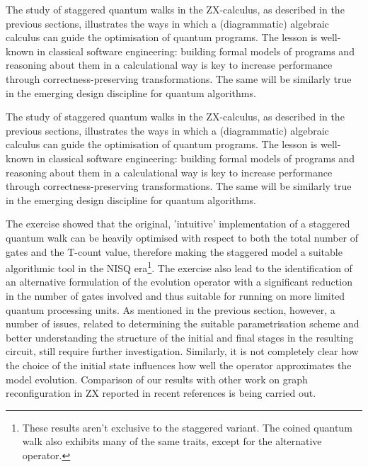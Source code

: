  The study of staggered quantum walks in the ZX-calculus, as described in the previous sections, illustrates the ways in which a (diagrammatic) algebraic calculus can guide the optimisation of quantum programs. The lesson is well-known in classical software engineering: building formal models of programs and reasoning about them in a calculational way is key to increase performance through correctness-preserving transformations. The same will be similarly true in the emerging design discipline for quantum algorithms.



 The study of staggered quantum walks in the ZX-calculus, as described in the previous sections, illustrates the ways in which a (diagrammatic) algebraic calculus can guide the optimisation of quantum programs. The lesson is well-known in classical software engineering: building formal models of programs and reasoning about them in a calculational way is key to increase performance through correctness-preserving transformations. The same will be similarly true in the emerging design discipline for quantum algorithms.




The exercise showed that the original, 'intuitive' implementation of a staggered quantum walk can be heavily optimised with respect to both the total number of gates and the T-count value, therefore making the staggered model a suitable algorithmic tool in the NISQ era\cite{Preskill2018}\footnote{These results aren't exclusive to the staggered variant. The coined quantum walk also exhibits many of the same traits, except for the alternative operator.}. The exercise also lead to the identification of an alternative formulation of the evolution operator with a significant reduction in the number of gates involved and thus suitable for running on more limited quantum processing units. As mentioned in the previous section, however, a number of issues, related to determining the  suitable parametrisation scheme and better understanding the structure of the initial and final stages in the resulting circuit,  still require further investigation. Similarly, it is not completely  clear how the choice of the initial state 
influences how well the operator approximates the model evolution. Comparison of our results with other work on graph reconfiguration in ZX reported in recent references \cite{Dun20,Ufr23} is being carried out.



